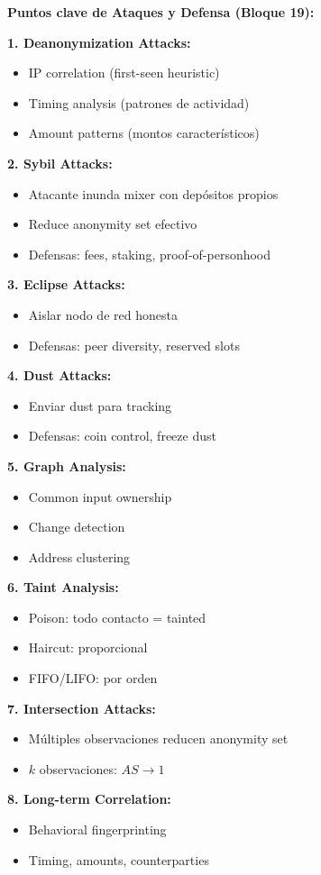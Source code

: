 \documentclass[11pt,a4paper,twoside]{book}
\theoremstyle{definition}
\theoremstyle{remark}
\begin{document}
\begin{keyidea}
\textbf{Puntos clave de Ataques y Defensa (Bloque 19):}

\textbf{1. Deanonymization Attacks:}
\begin{itemize}
    \item IP correlation (first-seen heuristic)
    \item Timing analysis (patrones de actividad)
    \item Amount patterns (montos característicos)
\end{itemize}

\textbf{2. Sybil Attacks:}
\begin{itemize}
    \item Atacante inunda mixer con depósitos propios
    \item Reduce anonymity set efectivo
    \item Defensas: fees, staking, proof-of-personhood
\end{itemize}

\textbf{3. Eclipse Attacks:}
\begin{itemize}
    \item Aislar nodo de red honesta
    \item Defensas: peer diversity, reserved slots
\end{itemize}

\textbf{4. Dust Attacks:}
\begin{itemize}
    \item Enviar dust para tracking
    \item Defensas: coin control, freeze dust
\end{itemize}

\textbf{5. Graph Analysis:}
\begin{itemize}
    \item Common input ownership
    \item Change detection
    \item Address clustering
\end{itemize}

\textbf{6. Taint Analysis:}
\begin{itemize}
    \item Poison: todo contacto = tainted
    \item Haircut: proporcional
    \item FIFO/LIFO: por orden
\end{itemize}

\textbf{7. Intersection Attacks:}
\begin{itemize}
    \item Múltiples observaciones reducen anonymity set
    \item $k$ observaciones: $AS \rightarrow 1$
\end{itemize}

\textbf{8. Long-term Correlation:}
\begin{itemize}
    \item Behavioral fingerprinting
    \item Timing, amounts, counterparties
\end{itemize}
\end{keyidea}
\end{document}
